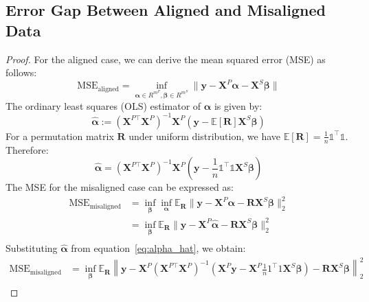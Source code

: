 \subsection{Error Gap Between Aligned and Misaligned Data}\label{subsec:proof-align-misalign}







\thmalignment*

\begin{proof}

For the aligned case, we can derive the mean squared error (MSE) as follows:
\begin{equation}\label{eq:mse_aligned}
    \mathrm{MSE}_\mathrm{aligned} = \inf_{\boldsymbol{\alpha} \in R^{m^P}, \boldsymbol{\beta} \in R^{m^S}} \|\mathbf{y} - \mathbf{X}^P \boldsymbol{\alpha} - \mathbf{X}^S \boldsymbol{\beta}\|
\end{equation}
The ordinary least squares (OLS) estimator of $\boldsymbol{\alpha}$ is given by:
\begin{equation}
    \hat{\boldsymbol{\alpha}} := (\mathbf{X}^{P \top} \mathbf{X}^P)^{-1} \mathbf{X}^P (\mathbf{y} - \mathbb{E}[\mathbf{R}] \mathbf{X}^S \boldsymbol{\beta}) 
\end{equation}
For a permutation matrix $\mathbf{R}$ under uniform distribution, we have $\mathbb{E}[\mathbf{R}] = \frac{1}{n}\mathds{1}^\top \mathds{1}$. Therefore:
\begin{equation}\label{eq:alpha_hat}
    \hat{\boldsymbol{\alpha}} = (\mathbf{X}^{P \top} \mathbf{X}^P)^{-1} \mathbf{X}^P (\mathbf{y} - \frac{1}{n} \mathds{1}^\top \mathds{1} \mathbf{X}^S \boldsymbol{\beta}) 
\end{equation}
The MSE for the misaligned case can be expressed as:
\begin{align}
    \mathrm{MSE}_{\mathrm{misaligned}} 
    & = \inf_{\boldsymbol{\beta}} \inf_{\boldsymbol{\alpha}} \mathbb{E}_\mathbf{R} \|\mathbf{y} - \mathbf{X}^P \boldsymbol{\alpha} - \mathbf{R} \mathbf{X}^S \boldsymbol{\beta}\|_2^2 \\
    & = \inf_{\boldsymbol{\beta}} \mathbb{E}_\mathbf{R} \|\mathbf{y} - \mathbf{X}^P \hat{\boldsymbol{\alpha}} - \mathbf{R} \mathbf{X}^S \boldsymbol{\beta}\|_2^2 \\
\end{align}
Substituting $\hat{\boldsymbol{\alpha}}$ from equation~\ref{eq:alpha_hat}, we obtain:
\begin{align}
    \mathrm{MSE}_{\mathrm{misaligned}} 
    & = \inf_{\boldsymbol{\beta}} \mathbb{E}_\mathbf{R} \left\|\mathbf{y} - \mathbf{X}^P (\mathbf{X}^{P \top} \mathbf{X}^P)^{-1} (\mathbf{X}^P \mathbf{y} - \mathbf{X}^P \frac{1}{n} 1^\top 1 \mathbf{X}^S \boldsymbol{\beta}) - \mathbf{R} \mathbf{X}^S \boldsymbol{\beta}\right\|_2^2 \\

\end{align}
\end{proof}
